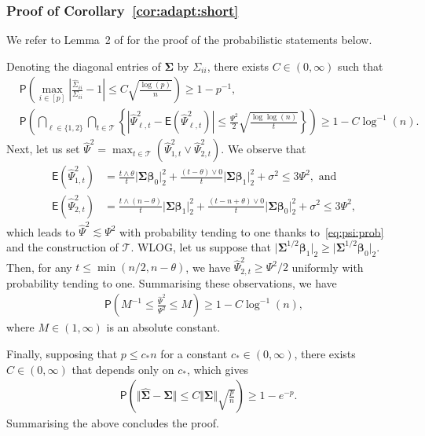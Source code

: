 \documentclass[11pt, a4paper]{article}
\newcommand{\mc}{\mathcal}
\renewcommand{\l}{\left}
\renewcommand{\r}{\right}
\def\wh{\widehat}
\newcommand{\cp}{\theta}
\newcommand{\E}[0]{\mathsf{E}}
\newcommand{\p}{\mathsf{P}}
\newcommand{\nn}{\nonumber}
\theoremstyle{definition}
\theoremstyle{definition}
\theoremstyle{definition}
\theoremstyle{definition}
\theoremstyle{definition}
\theoremstyle{remark}
\theoremstyle{definition}
\theoremstyle{definition}
\theoremstyle{definition}
\begin{document}
{
\subsubsection{Proof of Corollary~\ref{cor:adapt:short}}

We refer to Lemma~2 of \cite{moen2024minimax} for the proof of the probabilistic statements below. 

Denoting the diagonal entries of $\bm\Sigma$ by $\Sigma_{ii}$, there exists $C \in (0, \infty)$ such that
\begin{align}
& \p\l( \max_{i \in [p]} \l\lvert\frac{\wh\Sigma_{ii}}{\Sigma_{ii}} - 1\r\rvert \le C\sqrt{\frac{\log(p)}{n}} \r) \ge 1 - p^{-1},  
\nn \\
& \p\l( \bigcap_{\ell \in \{1, 2\}} \bigcap_{t \in \mc T} \l\{ \l\vert \wh\Psi^2_{\ell, t} - \E(\wh\Psi^2_{\ell, t}) \r\vert \le \frac{\Psi^2}{2} \sqrt{\frac{\log\log(n)}{t}} \r\} \r) \ge 1 - C \log^{-1}(n).
\label{eq:psi:prob}
\end{align}
Next, let us set $\wh\Psi^2 = \max_{t \in \mc T} (\wh\Psi^2_{1, t} \vee \wh\Psi^2_{2, t})$.
We observe that
\begin{align*}
\E(\wh\Psi^2_{1, t}) &= \frac{t \wedge \cp}{t} \vert \bm\Sigma \bm\beta_0 \vert_2^2 + \frac{(t - \cp) \vee 0}{t} \vert \bm\Sigma \bm\beta_1 \vert_2^2 + \sigma^2 \le 3\Psi^2, \text{ \ and}
\\
\E(\wh\Psi^2_{2, t}) &= \frac{t \wedge (n - \cp)}{t} \vert \bm\Sigma \bm\beta_1 \vert_2^2 + \frac{(t - n + \cp) \vee 0}{t} \vert \bm\Sigma \bm\beta_0 \vert_2^2 + \sigma^2 \le 3\Psi^2,
\end{align*}
which leads to $\wh\Psi^2 \lesssim \Psi^2$ with probability tending to one thanks to~\eqref{eq:psi:prob} and the construction of $\mc T$.
WLOG, let us suppose that $\vert \bm\Sigma^{1/2}\bm\beta_1 \vert_2 \ge \vert \bm\Sigma^{1/2}\bm\beta_0 \vert_2$.
Then, for any $t \le \min(n/2, n - \cp)$, we have
$\wh\Psi^2_{2, t} \ge \Psi^2/2$ uniformly with probability tending to one.
Summarising these observations, we have
\begin{align*}
\p\l( M^{-1} \le \frac{\wh\Psi^2}{\Psi^2} \le M \r) \ge 1 - C\log^{-1}(n),
\end{align*}
where $M \in (1, \infty)$ is an absolute constant.

Finally, supposing that $p \le c_* n$ for a constant $c_* \in (0, \infty)$, there exists $C \in (0, \infty)$ that depends only on $c_*$, which gives
\begin{align*}
& \p\l( \Vert \wh{\bm\Sigma} - \bm\Sigma \Vert \le C \Vert \bm\Sigma \Vert \sqrt{\frac{p}{n}} \r) \ge 1 - e^{-p}.
\end{align*}
Summarising the above concludes the proof.

}
\end{document}
